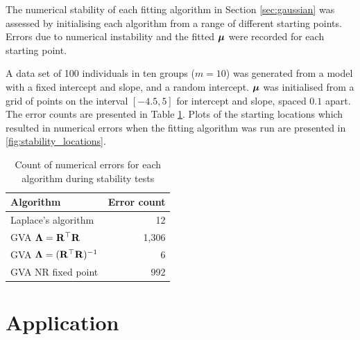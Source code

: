 \documentclass{amsart}[12pt]
\begin{document}
			The numerical stability of each fitting algorithm in Section \ref{sec:gaussian} was assessed by initialising
			each algorithm from a range of different starting points. Errors due to numerical instability and the fitted
			${\boldsymbol \mu}$ were recorded for each starting point.
					
			A data set of 100 individuals in ten groups ($m=10$) was generated from a model with a fixed intercept and
			slope, and a random intercept. ${\boldsymbol \mu}$ was initialised from a grid of points on the interval $[-4.5, 5]$ for
			intercept and slope, spaced $0.1$ apart. The error counts are presented in Table
			\ref{tab:stability_results}. Plots of the starting locations which resulted in numerical errors when the
			fitting algorithm was run are presented in \ref{fig:stability_locations}.
					
			\begin{table}
				\caption{Count of numerical errors for each algorithm during stability tests}
				\label{tab:stability_results}
				\begin{tabular}{|l|r|}
					\hline
					Algorithm                            & Error count \\
					\hline
					Laplace's algorithm                  & 12          \\
					GVA ${\boldsymbol \Lambda} = {\bf R}^\top {\bf R}$        & 1,306       \\
					GVA ${\boldsymbol \Lambda} = ({\bf R}^\top {\bf R})^{-1}$ & 6           \\
					GVA NR fixed point                   & 992         \\
					\hline
				\end{tabular}
			\end{table}
					
			\section{Application}
			\label{sec:application}
			
\end{document}
